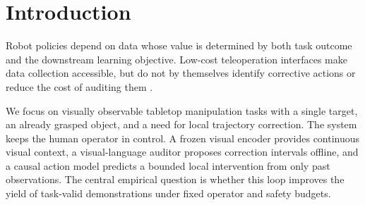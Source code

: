 \section{Introduction}
\label{sec:introduction}

Robot policies depend on data whose value is determined by both task outcome and
the downstream learning objective. Low-cost teleoperation interfaces make data
collection accessible, but do not by themselves identify corrective actions or
reduce the cost of auditing them \citep{gello2024,umi2024}.

We focus on visually observable tabletop manipulation tasks with a single
target, an already grasped object, and a need for local trajectory correction.
The system keeps the human operator in control. A frozen visual encoder provides
continuous visual context, a visual-language auditor proposes correction
intervals offline, and a causal action model predicts a bounded local
intervention from only past observations. The central empirical question is
whether this loop improves the yield of task-valid demonstrations under fixed
operator and safety budgets.

